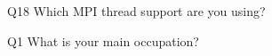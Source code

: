 \begin{description}%
\item{Q18} Which MPI thread support are you using?%
\item{Q1} What is your main occupation?%
\end{description}%
